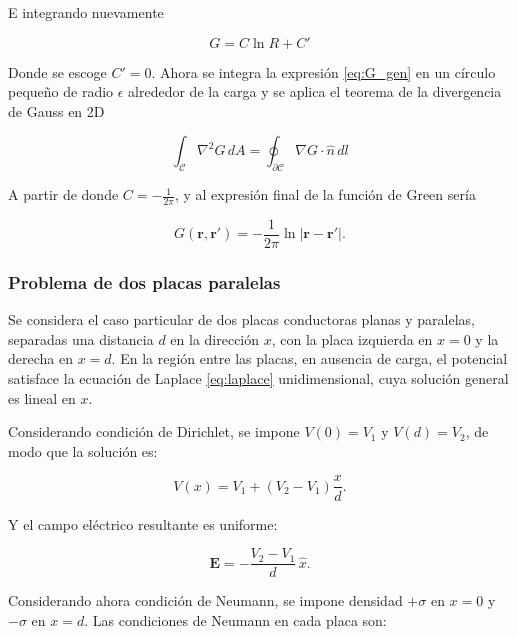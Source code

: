 \documentclass[12pt, twocolumn]{article}
\begin{document}
E integrando nuevamente

\begin{equation} \label{eq:G_gen}
    G = C \ln R + C'
\end{equation}

Donde se escoge $C' = 0$. Ahora se integra la expresión \ref{eq:G_gen} en un círculo pequeño de radio $\epsilon$ alrededor de la carga y se aplica el teorema de la divergencia de Gauss en 2D

\begin{equation}
    \int_{\mathcal{C}} \nabla^2 G \, dA = \oint_{\partial \mathcal{C}} \nabla G \cdot \hat{n} \, dl
\end{equation}

A partir de donde $C = - \frac{1}{2\pi}$, y al expresión final de la función de Green sería

\begin{equation}
    G(\mathbf{r}, \mathbf{r}') = -\frac{1}{2\pi}\ln|\mathbf{r} - \mathbf{r}'|.
    \label{eq:green_2d}
\end{equation}

\subsubsection{Problema de dos placas paralelas}

Se considera el caso particular de dos placas conductoras planas y paralelas, separadas una distancia $d$ en la dirección $x$, con la placa izquierda en $x = 0$ y la derecha en $x = d$. En la región entre las placas, en ausencia de carga, el potencial satisface la ecuación de Laplace \ref{eq:laplace} unidimensional, cuya solución general es lineal en $x$.

Considerando condición de Dirichlet, se impone $V(0) = V_1$ y $V(d) = V_2$, de modo que la solución es:

\begin{equation}
    V(x) = V_1 + (V_2 - V_1)\frac{x}{d}.
    \label{eq:sol_dirichlet}
\end{equation}

Y el campo eléctrico resultante es uniforme:

\begin{equation}
    \mathbf{E} = -\frac{V_2 - V_1}{d}\,\hat{x}.
    \label{eq:campo_dirichlet}
\end{equation}

Considerando ahora condición de Neumann, se impone densidad $+\sigma$ en $x = 0$ y $-\sigma$ en $x = d$. Las condiciones de Neumann en cada placa son:
\end{document}
